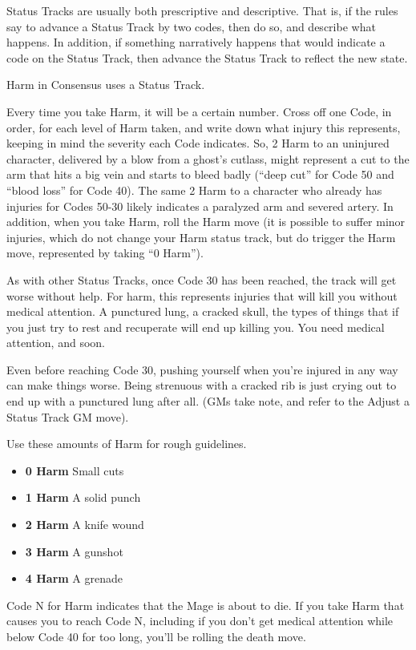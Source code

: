 \documentclass[letterpaper,12pt]{article}
\newcommand{\SECTION}[1]{\vspace{.5em}{\noindent\titlefont\large\textbf{#1}}

}
\begin{document}
Status Tracks are usually both prescriptive and descriptive. That is,
if the rules say to advance a Status Track by two codes, then do so,
and describe what happens. In addition, if something narratively
happens that would indicate a code on the Status Track, then advance
the Status Track to reflect the new state.

\SECTION{Harm}
Harm in Consensus uses a Status Track.

Every time you take Harm, it will be a certain number. Cross off one
Code, in order, for each level of Harm taken, and write down what
injury this represents, keeping in mind the severity each Code
indicates. So, 2 Harm to an uninjured character, delivered by a blow
from a ghost's cutlass, might represent a cut to the arm that hits a
big vein and starts to bleed badly (``deep cut'' for Code 50 and
``blood loss'' for Code 40). The same 2 Harm to a character who
already has injuries for Codes 50-30 likely indicates a paralyzed arm
and severed artery. In addition, when you take Harm, roll the Harm
move (it is possible to suffer minor injuries, which do not change
your Harm status track, but do trigger the Harm move, represented by
taking ``0 Harm'').

As with other Status Tracks, once Code 30 has been reached, the track
will get worse without help. For harm, this represents injuries that
will kill you without medical attention. A punctured lung, a cracked
skull, the types of things that if you just try to rest and recuperate
will end up killing you. You need medical attention, and soon.

Even before reaching Code 30, pushing yourself when you're injured in
any way can make things worse. Being strenuous with a cracked rib is
just crying out to end up with a punctured lung after all. (GMs take
note, and refer to the Adjust a Status Track GM move).

Use these amounts of Harm for rough guidelines.

\begin{itemize}
  \setlength{\itemsep}{0em}
\item \textbf{0 Harm} Small cuts
\item \textbf{1 Harm} A solid punch
\item \textbf{2 Harm} A knife wound
\item \textbf{3 Harm} A gunshot
\item \textbf{4 Harm} A grenade
\end{itemize}

Code N for Harm indicates that the Mage is about to die. If you take
Harm that causes you to reach Code N, including if you don't get
medical attention while below Code 40 for too long, you'll be rolling
the death move.
\end{document}
